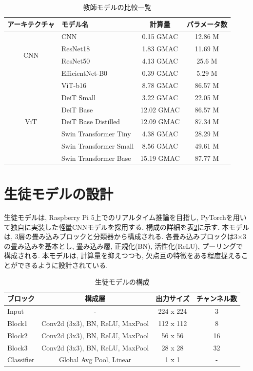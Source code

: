 \begin{table}[htbp]
\caption{教師モデルの比較一覧}
\label{table:teacher_models}
\begin{center}
\begin{tabular}{clcc} \hline
  アーキテクチャ & モデル名 & 計算量 & パラメータ数 \\ \hline
  \multirow{4}{*}{CNN} & CNN & 0.15 GMAC & 12.86 M \\
   & ResNet18 & 1.83 GMAC & 11.69 M \\
   & ResNet50 & 4.13 GMAC & 25.6 M \\
   & EfficientNet-B0 & 0.39 GMAC & 5.29 M \\ \hline
  \multirow{7}{*}{ViT} & ViT-b16 & 8.78 GMAC & 86.57 M \\
   & DeiT Small & 3.22 GMAC & 22.05 M \\
   & DeiT Base & 12.02 GMAC & 86.57 M \\
   & DeiT Base Distilled & 12.09 GMAC & 87.34 M \\
   & Swin Transformer Tiny & 4.38 GMAC & 28.29 M \\
   & Swin Transformer Small & 8.56 GMAC & 49.61 M \\
   & Swin Transformer Base & 15.19 GMAC & 87.77 M \\ \hline
\end{tabular}
\end{center}
\end{table}

\section{生徒モデルの設計}
生徒モデルは, Raspberry Pi 5上でのリアルタイム推論を目指し, PyTorchを用いて独自に実装した軽量CNNモデルを採用する.
構成の詳細を表\ref{table:student_model}に示す.
本モデルは, 3層の畳み込みブロックと分類器から構成される.
各畳み込みブロックは3×3の畳み込みを基本とし, 畳み込み層, 正規化(BN), 活性化(ReLU), プーリングで構成される.
本モデルは, 計算量を抑えつつも, 欠点豆の特徴をある程度捉えることができるように設計されている.

\begin{table}[htbp]
\centering
\caption{生徒モデルの構成}
\label{table:student_model}
\begin{tabular}{lccc} \hline
  ブロック & 構成層 & 出力サイズ & チャンネル数 \\ \hline
  Input & - & 224 x 224 & 3 \\
  Block1 & Conv2d (3x3), BN, ReLU, MaxPool & 112 x 112 & 8 \\
  Block2 & Conv2d (3x3), BN, ReLU, MaxPool & 56 x 56 & 16 \\
  Block3 & Conv2d (3x3), BN, ReLU, MaxPool & 28 x 28 & 32 \\
  Classifier & Global Avg Pool, Linear & 1 x 1 & - \\ \hline
\end{tabular}
\end{table}

